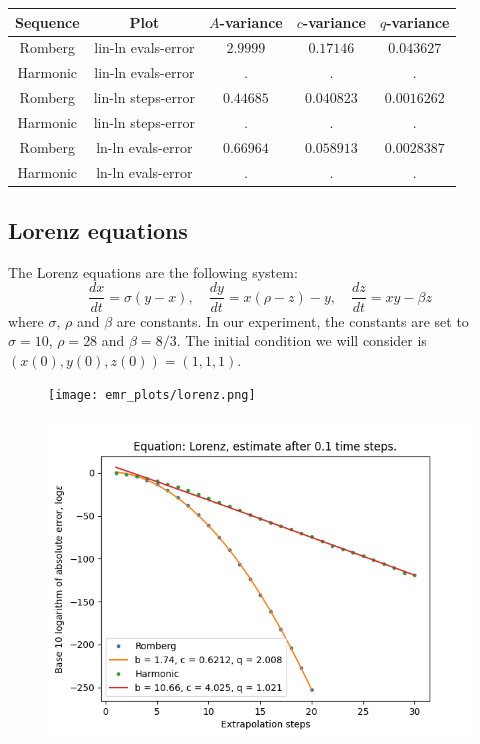\begin{table}[H]
    \centering
    \begin{tabular}{c|c||c|c|c}
Sequence & Plot & \(A\)-variance & \(c\)-variance & \(q\)-variance\\\hline
Romberg & lin-ln evals-error & \(2.9999\) & \(0.17146\) & \(0.043627\) \\
Harmonic & lin-ln evals-error & . & . & . \\
Romberg & lin-ln steps-error & \(0.44685\) & \(0.040823\) & \(0.0016262\) \\
Harmonic & lin-ln steps-error & . & . & . \\
Romberg & ln-ln evals-error & \(0.66964\) & \(0.058913\) & \(0.0028387\) \\
Harmonic & ln-ln evals-error & . & . & . \\
    \end{tabular}
    \label{tab:my_label}
\end{table}

\subsection{Lorenz equations}

The Lorenz equations are the following system: 
\[
\frac{dx}{dt} = \sigma (y-x),\quad \frac{dy}{dt} = x(\rho - z) - y,\quad \frac{dz}{dt} = xy - \beta z
\]
where \(\sigma,\,\rho\) and \(\beta\) are constants. In our experiment, the constants are set to \(\sigma = 10\), \(\rho = 28\) and \(\beta = 8/3\). The initial condition we will consider is \((x(0),y(0),z(0)) = (1,1,1)\).\\

\begin{figure}[H]
\centering
\begin{minipage}{0.45\textwidth}
\centering
\texttt{[image: emr\_plots/lorenz.png]}
\end{minipage}
\begin{minipage}{0.45\textwidth}
\centering
\includegraphics[scale=0.45]{emr_plots/lorenz_hp_steps.png}
\end{minipage}
\end{figure}

